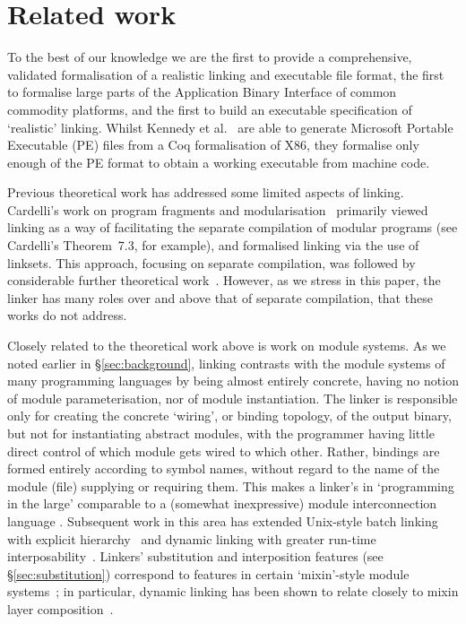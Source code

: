 \documentclass[preprint,10pt]{sigplanconf-pldi16}
\begin{document}

\section{Related work}
\label{sect.related.work}

To the best of our knowledge we are the first to provide a comprehensive, validated formalisation of a realistic linking and executable file format, the first to formalise large parts of the Application Binary Interface of common commodity platforms, and the first to build an executable specification of `realistic' linking.
Whilst Kennedy et al.~\cite{kennedy-coq-2013} are able to generate Microsoft Portable Executable (PE) files from a Coq formalisation of X86, they formalise only enough of the PE format to obtain a working executable from machine code. %

Previous theoretical work has addressed some limited aspects of linking.
Cardelli's work on program fragments and modularisation~\cite{cardelli-program-1997} primarily viewed linking as a way of facilitating the separate compilation of modular programs (see Cardelli's Theorem~7.3, for example), and formalised linking via the use of linksets.
This approach, focusing on separate compilation, was followed by considerable further theoretical work~\cite{glew-type-safe-1999, machkasova-calculus-2000, wells-equational-2000, fagorzi-calculus-2007}.
However, as we stress in this paper, the linker has many roles over and above that of separate compilation, that these works do not address.

Closely related to the theoretical work above is work on module systems.
As we noted earlier in \S\ref{sec:background}, linking contrasts with the module systems of many programming languages by being almost entirely concrete, having no notion of module parameterisation, nor of module instantiation.
The linker is responsible only for creating the concrete `wiring', or binding topology, of the output binary, but not for instantiating abstract modules, with the programmer having little direct control of which module gets wired to which other.
Rather, bindings are formed entirely according to symbol names, without regard to the name of the module (file) supplying or requiring them.
This makes a linker's in `programming in the large' comparable to a (somewhat inexpressive) module interconnection language \citep{deremer_programming-in-the_1975}.
Subsequent work in this area has extended Unix-style batch linking with explicit hierarchy~\citep{reid_knit_2000} and dynamic linking with greater run-time interposability~\citep{serra_ditools_2000}.
Linkers' substitution and interposition features (see \S\ref{sec:substitution}) correspond to features in certain `mixin'-style module systems~\cite{cannon-flavors-1982, bracha-mixin-1990}; in particular, dynamic linking has been shown to relate closely to mixin layer composition~\citep{smaragdakis_layered_2002}.
\end{document}

